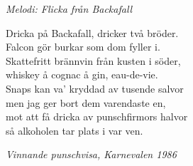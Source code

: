 {\footnotesize\textit{Melodi: Flicka från Backafall}}\par
\vspace{10pt}
Dricka på Backafall, dricker två bröder.\\
Falcon gör burkar som dom fyller i.\\
Skattefritt brännvin från kusten i söder,\\
whiskey å cognac å gin, eau-de-vie.\\
Snaps kan va’ kryddad av tusende salvor\\
men jag ger bort dem varendaste en,\\
mot att få dricka av punschfirmors halvor\\
så alkoholen tar plats i var ven.\\
\par
\vspace{10pt}
{\footnotesize\textit{Vinnande punschvisa, Karnevalen 1986}}

